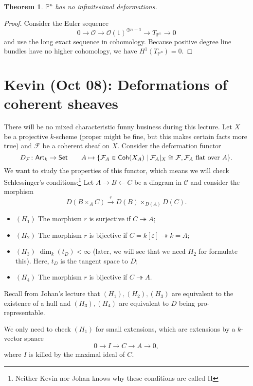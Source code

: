 \documentclass[leqno, openany]{memoir}
\newtheorem{thm}{Theorem}[section]
\theoremstyle{definition}
\theoremstyle{remark}
\theoremstyle{plain}
\theoremstyle{definition}
\theoremstyle{remark}
\renewcommand{\P}{\mathbb{P}}
\newcommand{\ep}{\varepsilon}
\newcommand{\mc}[1]{\mathcal{#1}}
\newcommand{\ms}[1]{\mathsf{#1}}
\begin{document}
\begin{thm}
    $\P^n$ has no infinitesimal deformations.
\end{thm}

\begin{proof}
    Consider the Euler sequence
    \[ 0 \to \mc{O} \to {\mc{O}(1)}^{\oplus n+1} \to T_{\P^n} \to 0 \]
    and use the long exact sequence in cohomology. Because positive degree line bundles have no higher cohomology, we have $H^1(T_{\P^n}) = 0$.
\end{proof}

\chapter{Kevin (Oct 08): Deformations of coherent sheaves}%
\label{cha:kevin_oct_08_deformations_of_coherent_sheaves}

There will be no mixed characteristic funny business during this lecture. Let $X$ be a projective $k$-scheme (proper might be fine, but this makes certain facts more true) and $\mc{F}$ be a coherent sheaf on $X$. Consider the deformation functor
\[ D_{\mc{F}} \colon \ms{Art}_k \to \ms{Set} \qquad A \mapsto \qty{\mc{F}_A \in \ms{Coh}(X_A) \mid \mc{F}_A |_X \cong \mc{F}, \mc{F}_A \text{ flat over }A }. \]
We want to study the properties of this functor, which means we will check Schlessinger's conditions:\footnote{Neither Kevin nor Johan knows why these conditions are called H} Let $A \to B \gets C$ be a diagram in $\mc{C}$ and consider the morphism
\[ D(B \times_A C) \xrightarrow{r} D(B) \times_{D(A)} D(C). \]
\begin{itemize}
    \item $(H_1)$ The morphism $r$ is surjective if $C \twoheadrightarrow A$;
    \item $(H_2)$ The morphism $r$ is bijective if $C = k[\ep] \twoheadrightarrow k = A$;
    \item $(H_3)$ $\dim_k(t_D) < \infty$ (later, we will see that we need $H_2$ for formulate this). Here, $t_D$ is the tangent space to $D$;
    \item $(H_4)$ The morphism $r$ is bijective if $C \twoheadrightarrow A$.
\end{itemize}
Recall from Johan's lecture that $(H_1), (H_2), (H_3)$ are equivalent to the existence of a hull and $(H_3), (H_4)$ are equivalent to $D$ being pro-representable.

We only need to check $(H_1)$ for small extensions, which are extensions by a $k$-vector spaace
\[ 0 \to I \to C \to A \to 0, \]
where $I$ is killed by the maximal ideal of $C$.
\end{document}
